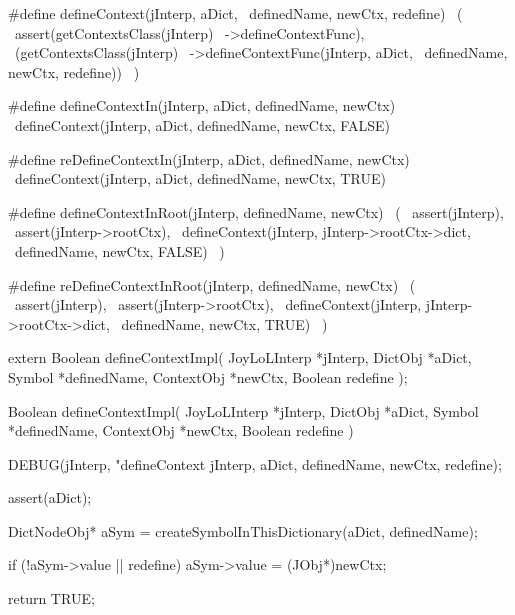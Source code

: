 #define defineContext(jInterp, aDict,     \
  definedName, newCtx, redefine)          \
  (                                       \
    assert(getContextsClass(jInterp)      \
      ->defineContextFunc),               \
    (getContextsClass(jInterp)            \
      ->defineContextFunc(jInterp, aDict, \
        definedName, newCtx, redefine))   \
  )

#define defineContextIn(jInterp, aDict, definedName, newCtx)  \
  defineContext(jInterp, aDict, definedName, newCtx, FALSE)

#define reDefineContextIn(jInterp, aDict, definedName, newCtx)  \
  defineContext(jInterp, aDict, definedName, newCtx, TRUE)

#define defineContextInRoot(jInterp, definedName, newCtx) \
  (                                                       \
    assert(jInterp),                                      \
    assert(jInterp->rootCtx),                             \
    defineContext(jInterp, jInterp->rootCtx->dict,        \
      definedName, newCtx, FALSE)                         \
  )

#define reDefineContextInRoot(jInterp, definedName, newCtx) \
  (                                                         \
    assert(jInterp),                                        \
    assert(jInterp->rootCtx),                               \
    defineContext(jInterp, jInterp->rootCtx->dict,          \
      definedName, newCtx, TRUE)                            \
  )
\stopCHeader

\setCHeaderStream{private}
\startCHeader
extern Boolean defineContextImpl(
  JoyLoLInterp *jInterp,
  DictObj      *aDict,
  Symbol       *definedName,
  ContextObj   *newCtx,
  Boolean       redefine
);
\stopCHeader
\setCHeaderStream{public}

\startCCode
Boolean defineContextImpl(
  JoyLoLInterp *jInterp,
  DictObj      *aDict,
  Symbol       *definedName,
  ContextObj   *newCtx,
  Boolean       redefine
) {
  DEBUG(jInterp, "defineContext %
        jInterp, aDict, definedName, newCtx, redefine);

  assert(aDict);
  
  DictNodeObj* aSym =
    createSymbolInThisDictionary(aDict, definedName);

  if (!aSym->value || redefine) {
    aSym->value   = (JObj*)newCtx;
  }

  return TRUE;
}
\stopCCode
